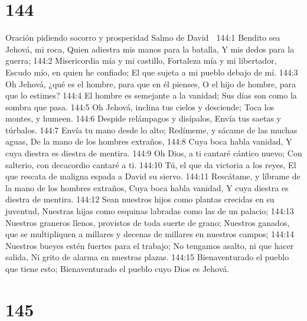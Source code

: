 \chapter{144}

Oración pidiendo socorro y prosperidad 
Salmo de David 

144:1 Bendito sea Jehová, mi roca, 
Quien adiestra mis manos para la batalla, 
Y mis dedos para la guerra; 
144:2 Misericordia mía y mi castillo, 
Fortaleza mía y mi libertador, 
Escudo mío, en quien he confiado; 
El que sujeta a mi pueblo debajo de mí. 
144:3 Oh Jehová, ¿qué es el hombre, para que en él pienses, 
O el hijo de hombre, para que lo estimes? 
144:4 El hombre es semejante a la vanidad; 
Sus días son como la sombra que pasa. 
144:5 Oh Jehová, inclina tus cielos y desciende; 
Toca los montes, y humeen. 
144:6 Despide relámpagos y disípalos, 
Envía tus saetas y túrbalos. 
144:7 Envía tu mano desde lo alto; 
Redímeme, y sácame de las muchas aguas, 
De la mano de los hombres extraños, 
144:8 Cuya boca habla vanidad, 
Y cuya diestra es diestra de mentira. 
144:9 Oh Dios, a ti cantaré cántico nuevo; 
Con salterio, con decacordio cantaré a ti. 
144:10 Tú, el que da victoria a los reyes, 
El que rescata de maligna espada a David su siervo. 
144:11 Rescátame, y líbrame de la mano de los hombres extraños, 
Cuya boca habla vanidad, 
Y cuya diestra es diestra de mentira. 
144:12 Sean nuestros hijos como plantas crecidas en su juventud, 
Nuestras hijas como esquinas labradas como las de un palacio; 
144:13 Nuestros graneros llenos, provistos de toda suerte de grano; 
Nuestros ganados, que se multipliquen a millares y decenas de millares en nuestros campos; 
144:14 Nuestros bueyes estén fuertes para el trabajo; 
No tengamos asalto, ni que hacer salida, 
Ni grito de alarma en nuestras plazas. 
144:15 Bienaventurado el pueblo que tiene esto; 
Bienaventurado el pueblo cuyo Dios es Jehová. 

\chapter{145}

